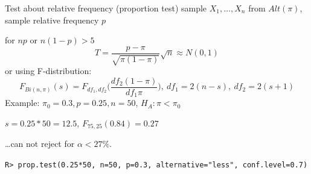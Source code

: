 \documentclass[smaller]{beamer}
\def\blue#1{{\usebeamercolor[fg]{my blue} #1}}
\def\xskip{{\vspace{2ex}}}
\begin{document}
\begin{frame}[fragile]{Test about relative frequency (proportion test)}
sample $X_1,\dots, X_n$ from $Alt(\pi)$, sample relative frequency $p$

\xskip
for $np$ or $n(1-p) > 5$
\[
  T=\frac{p - \pi}{\sqrt{\pi(1-\pi)}}\sqrt{n} \approx N(0,1)
\]
or using F-distribution:
\[
  F_{Bi(n,\pi)}(s) = F_{df_1,df_2} \Big(\frac{df_2(1-\pi)}{df_1\pi}\Big),\ df_1=2(n-s),\ df_2=2(s+1)
\]
\blue{Example:}
$\pi_0 = 0.3, p=0.25, n=50$, $H_A: \pi < \pi_0$

$s=0.25*50=12.5$, $F_{75,25}( 0.84 ) = 0.27$

\dots can not reject for $\alpha <27\%$.

\xskip
{\small
\verb'R> prop.test(0.25*50, n=50, p=0.3, alternative="less", conf.level=0.7)' 
}
\end{frame}
\end{document}

